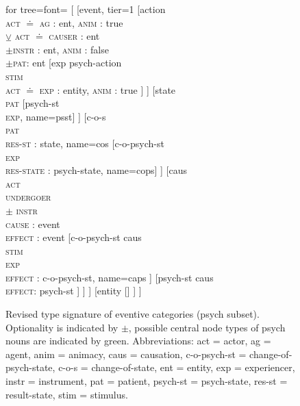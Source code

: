 \begin{sidewaysfigure}
			\begin{forest} for tree={font=\itshape}
			[
				[event, tier=1
					[action
						\\\textsc{act} $\doteq$ \textsc{ag :} ent{,} \textsc{anim :} true
						\\ $\veebar$ \textsc{act} $\doteq$ \textsc{causer :} ent{}
						\\ $\pm$\textsc{instr :} ent{,} \textsc{anim :} false   
						\\ $\pm$\textsc{pat: } ent{}
								[\textcolor{lsRichGreen}{exp psych-action}
								\\\textsc{stim}\\
								\textsc{act} $\doteq$ \textsc{exp :} entity{,} \textsc{anim :} true
								]
					]
					[state\\\textsc{pat}
						[\textcolor{lsRichGreen}{psych-st}\\\textsc{exp}, name=psst]
					]
					[c-o-s\\\textsc{pat}\\\textsc{res-st :} state, name=cos
						[c-o-psych-st\\\textsc{exp}\\\textsc{res-state :} psych-state, name=cops]
					]
					[caus\\
						\textsc{act} \\ 
						\textsc{undergoer} \\ 
						$\pm$ \textsc{instr}\\
						\textsc{cause} : event\\ 
						\textsc{effect} : event
								[\textcolor{lsRichGreen}{c-o-psych-st caus}\\
								\textsc{stim}\\
								\textsc{exp}\\
								\textsc{effect :} c-o-psych-st, name=caps
								]
								[\textcolor{lsRichGreen}{psych-st caus}\\
								\textsc{effect}: psych-st
								]
					]
				]
					[entity
						[\normalfont{[\ldots]}]
					]
				]
			\end{forest}
		\caption[Revised type signature of eventive categories (psych subset)]{\label{fig:signature-update2} Revised type signature of eventive categories (psych subset). Optionality is indicated by $\pm$, possible central node types of psych nouns are indicated by green. Abbreviations: act = actor, ag = agent, anim = animacy, caus = causation, c-o-psych-st = change-of-psych-state, c-o-s = change-of-state, ent = entity, exp = experiencer, instr = instrument, pat = patient, psych-st = psych-state, res-st = result-state, stim = stimulus.}
\end{sidewaysfigure}


